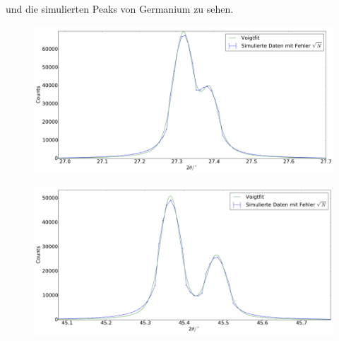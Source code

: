 und die simulierten Peaks von Germanium zu sehen.
\begin{figure}[H]
\begin{minipage}{.52\textwidth}
  \centering
  \includegraphics[scale=0.18]{Simulation_Germaniumpulver_1}
  \label{fig:pul_sim_ger_1}
\end{minipage}
\hspace{0.2cm}
\begin{minipage}{.52\textwidth}
  \centering
  \includegraphics[scale=0.18]{Simulation_Germaniumpulver_2}
  \label{fig:pul_sim_ger_2}
\end{minipage}
\end{figure}
